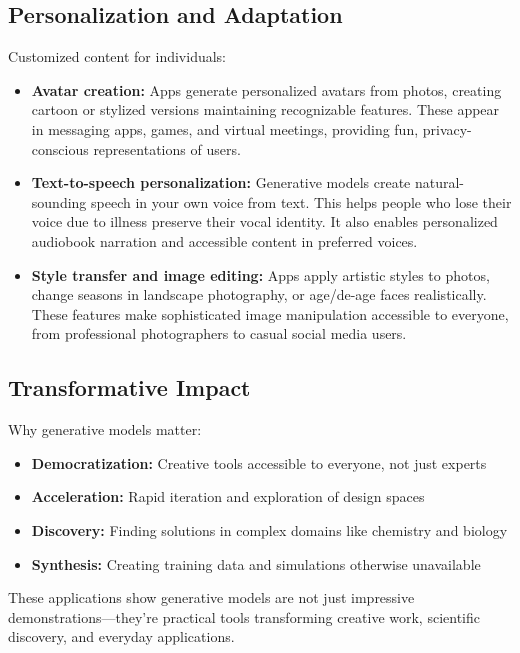 \subsection{Personalization and Adaptation}

Customized content for individuals:

\begin{itemize}
    \item \textbf{Avatar creation:} Apps generate personalized avatars from photos, creating cartoon or stylized versions maintaining recognizable features. These appear in messaging apps, games, and virtual meetings, providing fun, privacy-conscious representations of users.
    
    \item \textbf{Text-to-speech personalization:} Generative models create natural-sounding speech in your own voice from text. This helps people who lose their voice due to illness preserve their vocal identity. It also enables personalized audiobook narration and accessible content in preferred voices.
    
    \item \textbf{Style transfer and image editing:} Apps apply artistic styles to photos, change seasons in landscape photography, or age/de-age faces realistically. These features make sophisticated image manipulation accessible to everyone, from professional photographers to casual social media users.
\end{itemize}

\subsection{Transformative Impact}

Why generative models matter:
\begin{itemize}
    \item \textbf{Democratization:} Creative tools accessible to everyone, not just experts
    \item \textbf{Acceleration:} Rapid iteration and exploration of design spaces
    \item \textbf{Discovery:} Finding solutions in complex domains like chemistry and biology
    \item \textbf{Synthesis:} Creating training data and simulations otherwise unavailable
\end{itemize}

These applications show generative models are not just impressive demonstrations—they're practical tools transforming creative work, scientific discovery, and everyday applications.

